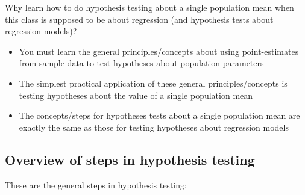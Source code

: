 \documentclass[
  letterpaper,
  DIV=11,
  numbers=noendperiod]{scrartcl}
\providecommand{\tightlist}{%
  \setlength{\itemsep}{0pt}\setlength{\parskip}{0pt}}\usepackage{longtable,booktabs,array}
\begin{document}
Why learn how to do hypothesis testing about a single population mean
when this class is supposed to be about regression (and hypothesis tests
about regression models)?

\begin{itemize}
\tightlist
\item
  You must learn the general principles/concepts about using
  point-estimates from sample data to test hypotheses about population
  parameters
\item
  The simplest practical application of these general
  principles/concepts is testing hypotheses about the value of a single
  population mean
\item
  The concepts/steps for hypotheses tests about a single population mean
  are exactly the same as those for testing hypotheses about regression
  models
\end{itemize}

\subsection{Overview of steps in hypothesis
testing}\label{overview-of-steps-in-hypothesis-testing}

These are the general steps in hypothesis testing:
\end{document}

